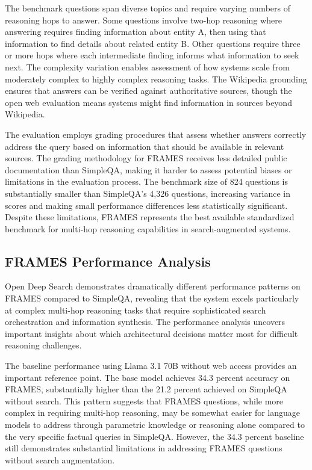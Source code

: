The benchmark questions span diverse topics and require varying numbers of reasoning hops to answer. Some questions involve two-hop reasoning where answering requires finding information about entity A, then using that information to find details about related entity B. Other questions require three or more hops where each intermediate finding informs what information to seek next. The complexity variation enables assessment of how systems scale from moderately complex to highly complex reasoning tasks. The Wikipedia grounding ensures that answers can be verified against authoritative sources, though the open web evaluation means systems might find information in sources beyond Wikipedia.

The evaluation employs grading procedures that assess whether answers correctly address the query based on information that should be available in relevant sources. The grading methodology for FRAMES receives less detailed public documentation than SimpleQA, making it harder to assess potential biases or limitations in the evaluation process. The benchmark size of 824 questions is substantially smaller than SimpleQA's 4,326 questions, increasing variance in scores and making small performance differences less statistically significant. Despite these limitations, FRAMES represents the best available standardized benchmark for multi-hop reasoning capabilities in search-augmented systems.

\subsection{FRAMES Performance Analysis}

Open Deep Search demonstrates dramatically different performance patterns on FRAMES compared to SimpleQA, revealing that the system excels particularly at complex multi-hop reasoning tasks that require sophisticated search orchestration and information synthesis. The performance analysis uncovers important insights about which architectural decisions matter most for difficult reasoning challenges.

The baseline performance using Llama 3.1 70B without web access provides an important reference point. The base model achieves 34.3 percent accuracy on FRAMES, substantially higher than the 21.2 percent achieved on SimpleQA without search. This pattern suggests that FRAMES questions, while more complex in requiring multi-hop reasoning, may be somewhat easier for language models to address through parametric knowledge or reasoning alone compared to the very specific factual queries in SimpleQA. However, the 34.3 percent baseline still demonstrates substantial limitations in addressing FRAMES questions without search augmentation.

